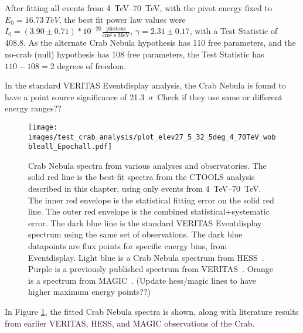   After fitting all events from \SIrange{4}{70}{TeV}, with the pivot energy fixed to $ E_{0}= \SI{16.73}{TeV} $, the best fit power law values were $ I_{0} = \left(3.90\pm0.71\right)*10^{-20} \frac{\textrm{photons}}{\textrm{cm}^{2} \; \textrm{s} \; \textrm{MeV} } $, $ \gamma = 2.31 \pm 0.17 $, with a Test Statistic of 408.8.
  As the alternate Crab Nebula hypothesis has 110 free parameters, and the no-crab (null) hypothesis has 108 free parameters, the Test Statistic has $ 110 - 108 = 2 $ degrees of freedom.
  
  In the standard VERITAS Eventdisplay analysis, the Crab Nebula is found to have a point source significance of \SI{21.3}{$\sigma$}.
  {\color{red}Check if they use same or different energy ranges??}
    
    
  \begin{figure}[h]
    \centering
    \texttt{[image: images/test\_crab\_analysis/plot\_elev27\_5\_32\_5deg\_4\_70TeV\_wobbleall\_Epochall.pdf]}
    \caption[Crab Test Spectrum]
    {
      Crab Nebula spectra from various analyses and observatories.
      The solid red line is the best-fit spectra from the CTOOLS analysis described in this chapter, using only events from \SIrange{4}{70}{TeV}.
      The inner red envelope is the statistical fitting error on the solid red line.
      The outer red envelope is the combined statistical+systematic error.
      The dark blue line is the standard VERITAS Eventdisplay spectrum using the same set of observations.
      The dark blue datapoints are flux points for specific energy bins, from Eventdisplay.
      Light blue is a Crab Nebula spectrum from HESS~\cite{hess2006crab}.
      Purple is a previously published spectrum from VERITAS~\cite{veritas2015crab}.
      Orange is a spectrum from MAGIC~\cite{magic2015crab}.
      {\color{red}(Update hess/magic lines to have higher maximum energy points??)}
    }
    \label{fig:crab_test_spectra}
  \end{figure}
    
  In Figure \ref{fig:crab_test_spectra}, the fitted Crab Nebula spectra is shown, along with literature results from earlier VERITAS, HESS, and MAGIC observations of the Crab.
  
